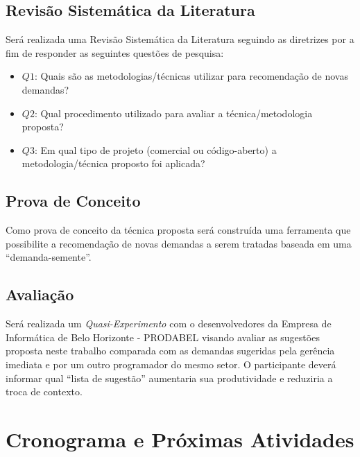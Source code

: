 \documentclass{article}
\begin{document}
\subsection{Revisão Sistemática da Literatura}
\label{sec:slr}

Será realizada uma Revisão Sistemática da Literatura seguindo as diretrizes por
\cite{keele2007guidelines} a fim de responder as seguintes questões de
pesquisa:


\begin{itemize}
  \item \textbf{$Q1$}: Quais são as metodologias/técnicas utilizar para
    recomendação de novas demandas?
  \item \textbf{$Q2$}: Qual procedimento utilizado para avaliar a
    técnica/metodologia proposta?
  \item \textbf{$Q3$}: Em qual tipo de projeto (comercial ou código-aberto) a
    metodologia/técnica proposto foi aplicada?
\end{itemize}





\subsection{Prova de Conceito}
\label{sec:prova-de-conceito}

Como prova de conceito da técnica proposta será construída uma ferramenta que
possibilite a recomendação de novas demandas a serem tratadas baseada em uma ``demanda-semente''.


\subsection{Avaliação}
\label{sec:avaliacao}

Será realizada um \textit{Quasi-Experimento} \cite{wohlin2012experimentation}
com o desenvolvedores da Empresa de Informática de Belo Horizonte - PRODABEL
visando avaliar as sugestões proposta neste trabalho comparada com as demandas
sugeridas pela gerência imediata e por um outro programador do mesmo setor. O
participante deverá informar qual ``lista de sugestão'' aumentaria sua
produtividade e reduziria a troca de contexto.


\section{Cronograma e Próximas Atividades}
\label{sec:cronograma}



\end{document}
